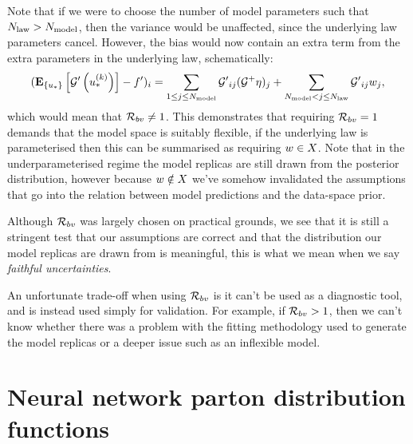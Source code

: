 Note that if we were to choose the
number of model parameters such that $N_{\rm law} > N_{\rm model}$, then the variance
would be unaffected, since the underlying law parameters cancel. However, the
bias would now contain an extra term from the extra parameters in the
underlying law, schematically:
\begin{equation}
    \begin{split}
        (\mathbf{E}_{\{ u_* \}} \left[ {{\mathcal{G}}^{\prime}}\left(u_*^{(k)}\right) \right] - {{f}^{\prime}})_i =
        \sum_{1 \leq j \leq N_{\rm model}} {{\mathcal{G}}^{\prime}}_{ij} (\mathcal{G}^+ \eta)_j +
        \sum_{N_{\rm model} < j \leq N_{\rm law}} {{\mathcal{G}}^{\prime}}_{ij} w_j,
    \end{split}
\end{equation}
which would mean that $\mathcal{R}_{bv} \neq 1$. This demonstrates that requiring
$\mathcal{R}_{bv} = 1$ demands that the model space is suitably flexible, if the
underlying law is parameterised then this can be summarised as requiring
$w \in X$. Note that in the
underparameterised regime the model replicas are still drawn from the posterior
distribution, however because $w \notin X$ we've somehow
invalidated the assumptions that go into the relation between model predictions
and the data-space prior.

Although $\mathcal{R}_{bv}$ was largely chosen on practical
grounds, we see that it is still a stringent test that our assumptions are
correct and that the distribution our model replicas are drawn from is meaningful,
this is what we mean when we say {\em faithful uncertainties}.

An unfortunate
trade-off when using $\mathcal{R}_{bv}$ is it can't be used as a diagnostic
tool, and is instead used simply for validation. For example, if
$\mathcal{R}_{bv} > 1$, then we
can't know whether there was a problem with the fitting methodology used to
generate the model replicas or a deeper issue such as an inflexible model.

\section{Neural network parton distribution functions}

